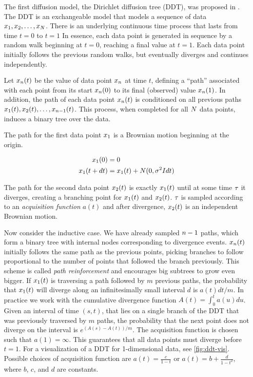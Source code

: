 The first diffusion model, the Dirichlet diffusion tree (DDT),
was proposed in \citet{Neal2003}.
The DDT is an exchangeable model that models a sequence of data
$x_1, x_2,\ldots,x_N$.
There is an underlying continuous time process
that lasts from time $t = 0$ to $t = 1$
In essence, each data point is generated in sequence by
a random walk beginning at $t = 0$,
reaching a final value at $t = 1$.
Each data point initially follows the previous
random walks, but eventually diverges and continues independently.

Let $x_n(t)$ be the value of data point $x_n$
at time $t$, defining a ``path'' associated
with each point from its start $x_n(0)$ to its final (observed) value $x_n(1)$.
In addition, the path of each data point $x_n(t)$ is conditioned
on all previous paths $x_1(t), x_2(t), \ldots, x_{n - 1}(t)$.
This process, when completed for all $N$ data points,
induces a binary tree over the data.

The path for the first data point $x_1$
is a Brownian motion
beginning at the origin.

\begin{align}
  x_1(0) &= 0 \\
  x_1(t + dt) &= x_1(t) + N(0, \sigma^2Idt)
\end{align}

The path for the second data point $x_2(t)$
is exactly $x_1(t)$ until
at some time $\tau$ it diverges,
creating a branching point for
$x_1(t)$ and $x_2(t)$.
$\tau$ is sampled according to an \emph{acquisition function}
$a(t)$ and
after divergence, $x_2(t)$ is an
independent Brownian motion.

Now consider the inductive case.
We have already sampled $n - 1$
paths, which form a binary tree
with internal nodes corresponding to
divergence events.
$x_n(t)$ initially follows the same
path as the previous points,
picking branches to follow proportional
to the number of points that followed
the branch previously.
This scheme is called \emph{path reinforcement}
and encourages
big subtrees to grow even bigger.
If $x_1(t)$ is traversing a path
followed by $m$ previous paths,
the probability that $x_1(t)$ will
diverge along an infinitesimally small
interval $d$ is 
$a(t)dt/m$. 
In practice we work with the cumulative
divergence function $A(t) = \int_0^t a(u)du$.
Given an interval of time $(s, t)$,
that lies on a single branch of the DDT
that was previously traversed by $m$ paths,
the probability that the next point
does not diverge on the interval
is $e^{(A(s) - A(t))/m}$.
The acquisition function is chosen such that
$a(1) = \infty$. This guarantees that
all data points must diverge 
before $t = 1$. 
For a visualization of a DDT
for 1-dimensional data, see \autoref{fig:ddt-vis}.
Possible choices of acquisition function
are $a(t) = \frac{c}{1 - t}$ or $a(t) = b + \frac{d}{1 - t^2}$,
where $b$, $c$, and $d$ are constants.

